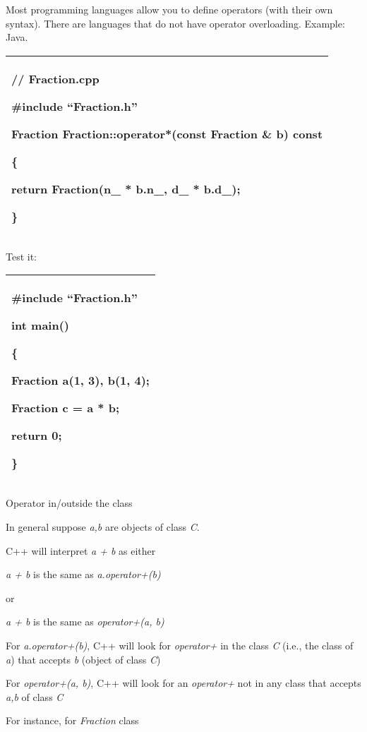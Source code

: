 \documentclass[
]{article}
\begin{document}
Most programming languages allow you to define operators (with their own
syntax). There are languages that do not have operator overloading.
Example: Java.

\begin{longtable}[]{@{}l@{}}
\toprule
\endhead
\begin{minipage}[t]{0.97\columnwidth}\raggedright
// Fraction.cpp

\#include ``Fraction.h''

Fraction Fraction::operator*(const Fraction \& b) const

\{

return Fraction(n\_ * b.n\_, d\_ * b.d\_);

\}\strut
\end{minipage}\tabularnewline
\bottomrule
\end{longtable}

Test it:

\begin{longtable}[]{@{}l@{}}
\toprule
\endhead
\begin{minipage}[t]{0.97\columnwidth}\raggedright
\#include ``Fraction.h''

int main()

\{

Fraction a(1, 3), b(1, 4);

Fraction c = a * b;

return 0;

\}\strut
\end{minipage}\tabularnewline
\bottomrule
\end{longtable}

Operator in/outside the class

In general suppose \emph{a,b} are objects of class \emph{C}.

C++ will interpret \emph{a + b} as either

\emph{a + b }is the same as\emph{ a.operator+(b)}

or

\emph{a + b }is the same as\emph{ operator+(a, b)}

For \emph{a.operator+(b)}, C++ will look for \emph{operator+} in the
class \emph{C} (i.e., the class of \emph{a}) that accepts \emph{b}
(object of class \emph{C})

For \emph{operator+(a, b)}, C++ will look for an \emph{operator+} not in
any class that accepts \emph{a,b} of class \emph{C}

For instance, for \emph{Fraction} class
\end{document}
